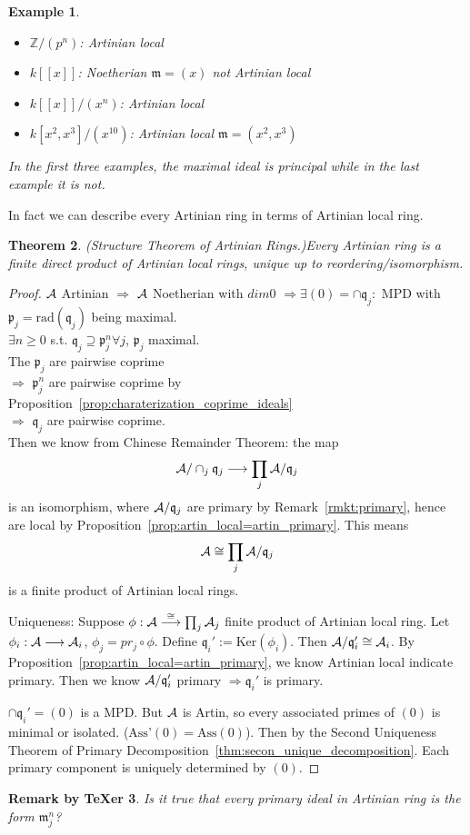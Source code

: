 \documentclass[11pt]{article}
\newtheorem{thm}{Theorem}[section]
\newtheorem{rmkt}[thm]{Remark by TeXer}
\newtheorem{ex}[thm]{Example}
\newcommand{\intg}{\mathbb Z}
\newcommand{\scm}{{\mathfrak m}}
\newcommand{\scp}{{\mathfrak p}}
\newcommand{\scq}{\mathfrak q}
\newcommand{\cala}{{\cal A}}
\newcommand{\Lrta}{\Longrightarrow}
\newcommand{\lrta}{\longrightarrow}
\begin{document}
\begin{ex}\ 
\begin{itemize}
\item $\intg/(p^n)$: Artinian   local
\item $k[[x]]$: Noetherian $\scm=(x)$ not Artinian   local
\item $k[[x]]/(x^n)$: Artinian   local
\item $k[x^2,x^3]/(x^{10})$: Artinian   local $\scm=(x^2,x^3)$
\end{itemize}
In the first three examples, the maximal ideal is principal while in the last example it is not.
\end{ex}

In fact we can describe every Artinian   ring in terms of Artinian   local ring.
\begin{thm}(Structure Theorem of Artinian   Rings.)\label{thm:Artin_product_of_Artin_local}
Every Artinian   ring is a finite direct product of Artinian   local rings, unique up to reordering/isomorphism.
\end{thm}
\begin{proof}
$\cala$ Artinian   $\Lrta $ $\cala$ Noetherian with $dim 0$ $\Lrta\exists (0)=\cap\scq_j:$ MPD with $\scp_j=\text{rad}(\scq_j)$ being maximal.\\
$\exists n\geq 0$  s.t. $\scq_j\supseteq \scp_j^n\forall j$, $\scp_j$ maximal.\\
The $\scp_j$ are pairwise coprime\\
$\Lrta$ $\scp_j^n$ are pairwise coprime by Proposition~\ref{prop:charaterization_coprime_ideals}\\
$\Lrta$ $\scq_j$ are pairwise coprime.\\ Then we know from Chinese Remainder Theorem:
the map
$$
\cala/\cap_j\scq_j\lrta \prod_j \cala/\scq_j
$$
 is an isomorphism, where $\cala/\scq_j$ are primary by Remark~\ref{rmkt:primary}, hence are local by Proposition~\ref{prop:artin_local=artin_primary}.
 This means 
 $$
\cala\cong\prod_j \cala/\scq_j
 $$
is a finite product of Artinian   local rings.

Uniqueness: Suppose $\phi:\cala\overset{\cong}{\lrta}\prod_j\cala_j$ finite product of Artinian   local ring. Let $\phi_i:\cala\lrta \cala_i$, $\phi_j=pr_j\circ\phi$. Define $\scq_i':=\text{Ker}(\phi_i)$. Then $\cala/\scq'_i\cong \cala_i$. By Proposition~\ref{prop:artin_local=artin_primary}, we know Artinian   local indicate primary. Then we know $\cala/\scq_i'$ primary $\Lrta\scq_i'$ is primary.

$\cap\scq_i'=(0)$ is a MPD.
But $\cala$ is Artin, so every associated primes of $(0)$ is minimal or isolated. ($\text{Ass'}(0)=\text{Ass}(0)$).  Then by the Second Uniqueness Theorem of Primary Decomposition~\ref{thm:secon_unique_decomposition}. Each primary component is uniquely determined by $(0)$.
\end{proof}
\begin{rmkt}
Is it true that every primary ideal in Artinian   ring is the form $\scm_j^n$?
\end{rmkt}
\end{document}
